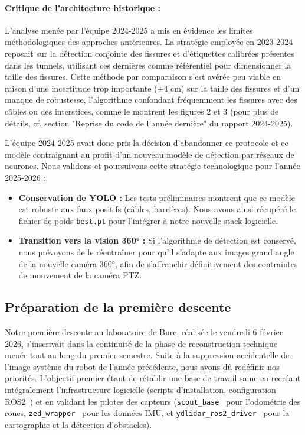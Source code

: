 \documentclass[12pt,a4paper]{article}
\begin{document}
\paragraph{Critique de l'architecture historique :} L'analyse menée par l'équipe 2024-2025 a mis en évidence les limites méthodologiques des approches antérieures. La stratégie employée en 2023-2024 reposait sur la détection conjointe des fissures et d'étiquettes calibrées présentes dans les tunnels, utilisant ces dernières comme référentiel pour dimensionner la taille des fissures. Cette méthode par comparaison s'est avérée peu viable en raison d'une incertitude trop importante ($\pm4$ cm) sur la taille des fissures et d'un manque de robustesse, l'algorithme confondant fréquemment les fissures avec des câbles ou des interstices, comme le montrent les figures 2 et 3 (pour plus de détails, cf. section "Reprise du code de l'année dernière" du rapport 2024-2025).

L'équipe 2024-2025 avait donc pris la décision d'abandonner ce protocole et ce modèle contraignant au profit d'un nouveau modèle de détection par réseaux de neurones. Nous validons et poursuivons cette stratégie technologique pour l'année 2025-2026 :
\begin{itemize}
    \item \textbf{Conservation de YOLO :} Les tests préliminaires montrent que ce modèle est robuste aux faux positifs (câbles, barrières). Nous avons ainsi récupéré le fichier de poids \texttt{best.pt} pour l'intégrer à notre nouvelle stack logicielle.
    \item \textbf{Transition vers la vision 360° :} Si l'algorithme de détection est conservé, nous prévoyons de le réentraîner pour qu'il s'adapte aux images grand angle de la nouvelle caméra 360°, afin de s'affranchir définitivement des contraintes de mouvement de la caméra PTZ.
\end{itemize}

\subsection{Préparation de la première descente}

Notre première descente au laboratoire de Bure, réalisée le vendredi 6 février 2026, s'inscrivait dans la continuité de la phase de reconstruction technique menée tout au long du premier semestre. Suite à la suppression accidentelle de l'image système du robot de l'année précédente, nous avons dû redéfinir nos priorités. L'objectif premier étant de rétablir une base de travail saine en recréant intégralement l'infrastructure logicielle (scripts d'installation, configuration ROS2~\cite{ros2}) et en validant les pilotes des capteurs (\texttt{scout\_base}~\cite{scout_ros2} pour l'odométrie des roues, \texttt{zed\_wrapper}~\cite{zed_ros2_wrapper} pour les données IMU, et \texttt{ydlidar\_ros2\_driver}~\cite{ydlidar_ros2_driver} pour la cartographie et la détection d'obstacles).
\end{document}
